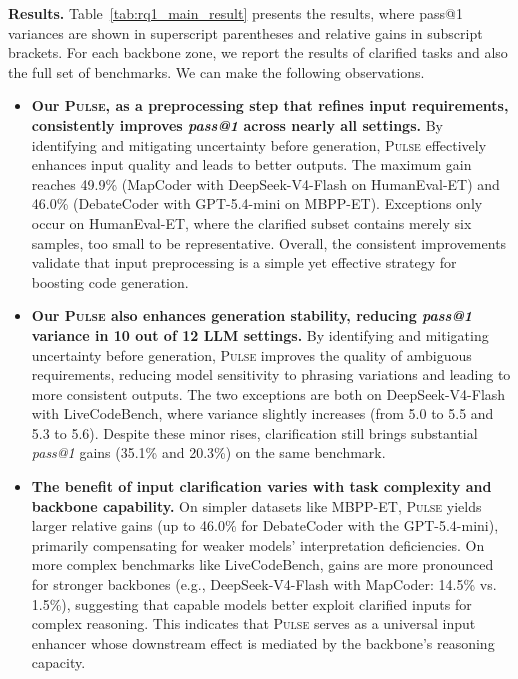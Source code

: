 \noindent \textbf{Results.}
Table~\ref{tab:rq1_main_result} presents the results, where pass@1 variances are shown in superscript parentheses and relative gains in subscript brackets.  For each backbone zone, we report the results of clarified tasks and also the full set of benchmarks. We can make the following observations.
\begin{itemize}[leftmargin=1em]
    \item \textbf{Our \textsc{Pulse}, as a preprocessing step that refines input requirements, consistently improves \emph{pass@1} across nearly all settings.} By identifying and mitigating uncertainty before generation, \textsc{Pulse} effectively enhances input quality and leads to better outputs. The maximum gain reaches 49.9\% (MapCoder with DeepSeek-V4-Flash on HumanEval-ET) and 46.0\% (DebateCoder with GPT-5.4-mini on MBPP-ET). Exceptions only occur on HumanEval-ET, where the clarified subset contains merely six samples, too small to be representative. Overall, the consistent improvements validate that input preprocessing is a simple yet effective strategy for boosting code generation.

    \item \textbf{Our \textsc{Pulse} also enhances generation stability, reducing \emph{pass@1} variance in 10 out of 12 LLM settings.} By identifying and mitigating uncertainty before generation, \textsc{Pulse} improves the quality of ambiguous requirements, reducing model sensitivity to phrasing variations and leading to more consistent outputs. The two exceptions are both on DeepSeek-V4-Flash with LiveCodeBench, where variance slightly increases (from 5.0 to 5.5 and 5.3 to 5.6). Despite these minor rises, clarification still brings substantial \emph{pass@1} gains (35.1\% and 20.3\%) on the same benchmark.
    
    \item \textbf{The benefit of input clarification varies with task complexity and backbone capability.} On simpler datasets like MBPP-ET, \textsc{Pulse} yields larger relative gains (up to 46.0\% for DebateCoder with the GPT-5.4-mini), primarily compensating for weaker models' interpretation deficiencies. On more complex benchmarks like LiveCodeBench, gains are more pronounced for stronger backbones (e.g., DeepSeek-V4-Flash with MapCoder: 14.5\% vs. 1.5\%), suggesting that capable models better exploit clarified inputs for complex reasoning. This indicates that \textsc{Pulse} serves as a universal input enhancer whose downstream effect is mediated by the backbone's reasoning capacity.

\end{itemize}


